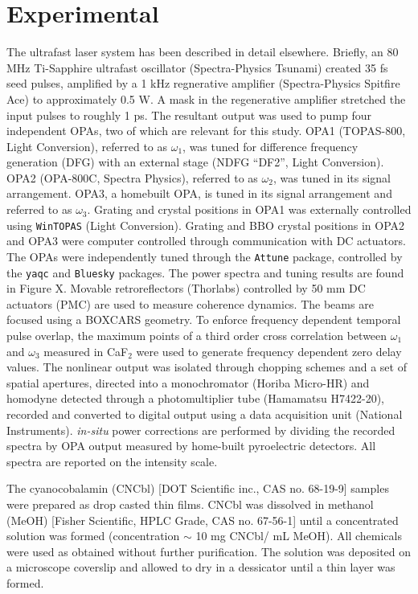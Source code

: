 \documentclass[aip, jcp, reprint, twocolumn]{revtex4-2}
\begin{document}
\section{Experimental}\label{experimental}

The ultrafast laser system has been described in detail elsewhere. \cite{RN278}
Briefly, an 80 MHz Ti-Sapphire ultrafast oscillator  (Spectra-Physics Tsunami) created 35 fs seed pulses, amplified by a 1 kHz regnerative amplifier (Spectra-Physics Spitfire Ace) to approximately 0.5 W.
A mask in the regenerative amplifier stretched the input pulses to roughly 1 ps.
The resultant output was used to pump four independent OPAs, two of which are relevant for this study.
OPA1 (TOPAS-800, Light Conversion), referred to as $\omega_1$, was tuned for difference frequency generation (DFG) with an external stage (NDFG ``DF2'', Light Conversion).
OPA2 (OPA-800C, Spectra Physics), referred to as $\omega_2$, was tuned in its signal arrangement. 
OPA3, a homebuilt OPA, is tuned in its signal arrangement and referred to as $\omega_3$.
Grating and crystal positions in OPA1 was externally controlled using \texttt{WinTOPAS} (Light Conversion).
Grating and BBO crystal positions in OPA2 and OPA3 were computer controlled through communication with DC actuators.
The OPAs were independently tuned through the \texttt{Attune} package, controlled by the \texttt{yaqc} and \texttt{Bluesky} packages. \cite{RN414, RN386, SkyeOPA, KyleOPA}
The power spectra and tuning results are found in Figure X. %
Movable retroreflectors (Thorlabs) controlled by 50 mm DC actuators (PMC) are used to measure coherence dynamics.
The beams are focused using a BOXCARS geometry.\cite{RN308, Kaufman2024}
To enforce frequency dependent temporal pulse overlap, the maximum points of a third order cross correlation between $\omega_1$ and $\omega_3$ measured in CaF$_2$ were used to generate frequency dependent zero delay values.
The nonlinear output was isolated through chopping schemes and a set of spatial apertures, directed into a monochromator (Horiba Micro-HR) and homodyne detected through a photomultiplier tube (Hamamatsu H7422-20), recorded and converted to digital output using a data acquisition unit (National Instruments).
\textit{in-situ} power corrections are performed by dividing the recorded spectra by OPA output measured by home-built pyroelectric detectors.
All spectra are reported on the intensity scale.

The cyanocobalamin (CNCbl) [DOT Scientific inc., CAS no. 68-19-9] samples were prepared as drop casted thin films.
CNCbl was dissolved in methanol (MeOH) [Fisher Scientific, HPLC Grade, CAS no. 67-56-1] until a concentrated solution was formed (concentration $\sim$ 10 mg CNCbl/ mL MeOH). 
All chemicals were used as obtained without further purification.
The solution was deposited on a microscope coverslip and allowed to dry in a dessicator until a thin layer was formed.
\end{document}
